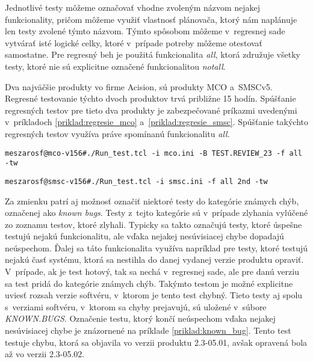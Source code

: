 Jednotlivé testy môžeme označovať vhodne zvoleným názvom nejakej 
funkcionality, pričom môžeme využiť vlastnosť plánovača, ktorý nám 
naplánuje len testy zvolené týmto názvom. Týmto spôsobom môžeme 
v~regresnej sade vytvárať isté logické celky, ktoré v~prípade potreby 
môžeme otestovať samostatne. Pre regresný beh je použitá funkcionalita 
\emph{all}, ktorá združuje všetky testy, ktoré nie sú explicitne označené 
funkcionalitou \emph{notall}. 

Dva najväčšie produkty vo firme Acision, sú produkty MCO a~SMSCv5.
Regresné testovanie týchto dvoch produktov trvá približne 15 hodín.
Spúšťanie regresných testov pre tieto dva produkty 
je zabezpečované príkazmi uvedenými v~príkladoch \ref{priklad:regresie_mco}
a~\ref{priklad:regresie_smsc}. Spúšťanie takýchto regresných testov využíva
práve spomínanú funkcionalitu \emph{all}.

\begin{lstlisting}[caption=Spúšťanie regresných testov v~produkte MCO
,label=priklad:regresie_mco]
meszarosf@mco-v156#./Run_test.tcl -i mco.ini -B TEST.REVIEW_23 -f all -tw
\end{lstlisting}

\begin{lstlisting}[caption=Spúšťanie regresných testov v~produkte SMSCv5
,label=priklad:regresie_smsc]
meszarosf@smsc-v156#./Run_test.tcl -i smsc.ini -f all 2nd -tw
\end{lstlisting}

Za zmienku patrí aj možnosť označiť niektoré testy do kategórie 
známych chýb, označenej ako \emph{known bugs}. 
Testy z~tejto kategórie sú v~prípade zlyhania vylúčené zo zoznamu 
testov, ktoré zlyhali.
Typicky sa takto označujú testy, ktoré úspešne testujú nejakú 
funkcionalitu, ale vďaka nejakej nesúvisiacej chybe 
dopadajú neúspechom. Ďalej sa táto funkcionalita využíva napríklad pre 
testy, ktoré testujú nejakú časť systému, ktorá sa nestihla do danej 
vydanej verzie produktu opraviť. V~prípade, ak je test hotový, tak sa 
nechá v~regresnej sade, ale pre danú verziu sa test pridá do kategórie 
známych chýb.
Takýmto testom je možné explicitne uviesť rozsah verzie softvéru, 
v~ktorom je tento test chybný. Tieto testy aj spolu s~verziami softvéru, 
v~ktorom sa chyby prejavujú, sú uložené v~súbore \emph{KNOWN.BUGS}.
Označenie testu, ktorý končí neúspechom vďaka nejakej 
nesúvisiacej chybe je znázornené na príklade \ref{priklad:known_bug}.
Tento test testuje chybu, ktorá sa objavila vo verzii produktu 2.3-05.01, 
avšak opravená bola až vo verzii 2.3-05.02. 

